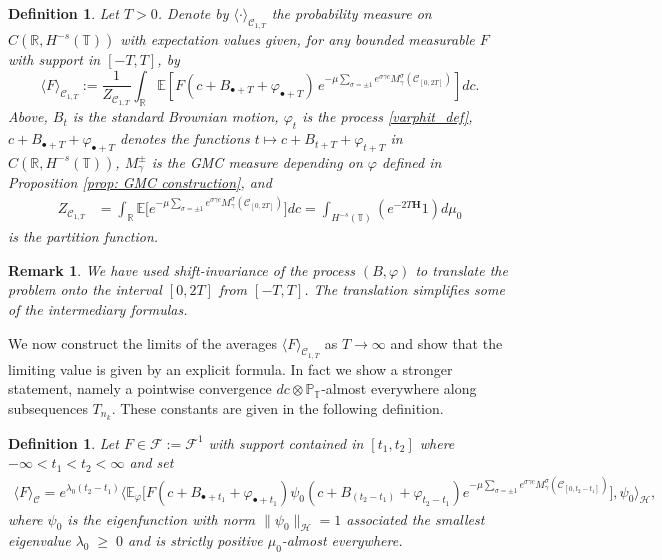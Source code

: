 \documentclass[11pt]{amsart}
\numberwithin{equation}{section}
\newtheorem{remark}[theorem]{Remark}
\newtheorem{definition}[theorem]{Definition}
\theoremstyle{definition}
\renewcommand{\geq}{\;\geqslant\;}                   %
\renewcommand{\H}{\mathbb{H}}
\newcommand{\R}{\mathbb{R}}
\newcommand{\cjd}{\rangle}
\newcommand{\cjg}{\langle}
\def\H{\mathbf{H}}
\def\E{\mathbb{E}}
\newcommand{\mc}{\mathcal}
\newcommand{\la}{\lambda}
\def\T{\mathbb{T}}
\begin{document}
\begin{definition}
Let $T>0$. Denote by $\langle \cdot \rangle_{\mc{C}_{1,T}}$ the probability measure on $C(\mathbb{R},H^{-s}(\T))$ with expectation values given, for any bounded measurable $F$ with support in $[-T,T]$, by
\[
\langle F \rangle_{\mc{C}_{1,T}}
:=
\frac{1}{Z_{\mc{C}_{1,T}}} \int_\R \E[F (c+B_{\bullet+T}+\varphi_{\bullet+T}) \,   e^{- \mu\sum_{\sigma = \pm 1} 
e^{\sigma\gamma c} M_\gamma^\sigma(\mc{C}_{[0,2T]})}]dc.
\]
Above, $B_t$ is the standard Brownian motion, $\varphi_t$ is the process \eqref{varphit_def},  $c+B_{\bullet+T}+\varphi_{\bullet+T}$ denotes the functions 
$t\mapsto  c+B_{t+T}+\varphi_{t+T}$ in $C(\R,H^{-s}(\T))$, $M_\gamma^\pm$ is the GMC measure depending on $\varphi$ defined in Proposition \ref{prop: GMC construction},  and 
\[\begin{split}
Z_{\mc{C}_{1,T}} & = \int_\R \mathbb{E}\Big[e^{- \mu\sum_{\sigma = \pm 1} 
e^{\sigma\gamma c} M_\gamma^\sigma(\mc{C}_{[0,2T]})}\Big]dc =\int_{H^{-s}(\T)}(e^{-2T\H}1)d\mu_0
\end{split}
\] 
is the partition function.
\end{definition}


\begin{remark}
We have used shift-invariance of the process $(B,\varphi)$ to translate the problem onto the interval $[0,2T]$ from $[-T,T]$. The translation simplifies some of the intermediary formulas. 
\end{remark}


We now construct the limits of the averages $\langle F \rangle_{\mc{C}_{1,T}}$ as $T \rightarrow \infty$ and show that the limiting value is given by an explicit formula. In fact we show a stronger statement, namely a pointwise convergence $dc\otimes \mathbb{P}_\mathbb{T}$-almost everywhere along subsequences $T_{n_k}$. 
These constants are given in the following definition. 

\begin{definition}\label{def:<F>}
Let $F \in \mathcal{F}:=\mc{F}^1$ with support contained in $[t_1,t_2]$ where $-\infty < t_1 < t_2 < \infty$ and set
\[\begin{split}
\cjg F\cjd_{\mc{C}}=	 e^{\lambda_0(t_2-t_1)} \Big\langle 	\mathbb{E}_{\varphi} \Big[ F(c+B_{\bullet+t_1}+
\varphi_{\bullet+t_1})\psi_0(c+B_{(t_2-t_1)}+
\varphi_{t_2-t_1}) e^{- \mu\sum_{\sigma = \pm 1} 
e^{\sigma\gamma c} M_\gamma^\sigma(\mc{C}_{[0,t_2-t_1]})}\big], \psi_0 \Big \rangle_{\mc{H}},\end{split}\]
where $\psi_0$ is the eigenfunction with norm $\|\psi_0\|_{\mc{H}}=1$ associated the smallest eigenvalue $\la_0\geq 0$ and is strictly positive $\mu_0$-almost everywhere.
\end{definition}
\end{document}
